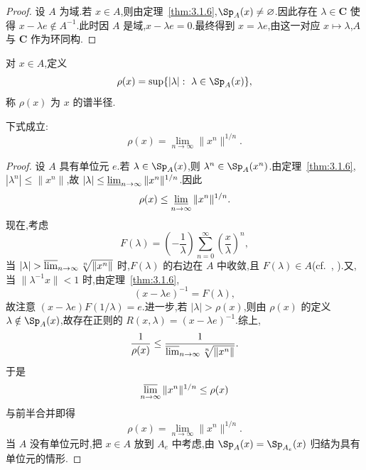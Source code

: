 \begin{proof}
设 $A$ 为域.若 $x \in A$,则由定理~\ref{thm:3.1.6},$\Sp_{A}(x) \neq \emptyset$.因此存在 $\lambda \in \mathbf{C}$ 使得 $x - \lambda e \notin A^{-1}$.此时因 $A$ 是域,$x - \lambda e = 0$.最终得到 $x = \lambda e$,由这一对应 $x \mapsto \lambda$,$A$ 与 $\mathbf{C}$ 作为环同构.
\end{proof}

\begin{definition}\label{def:3.1.8}
对 $x \in A$,定义
\begin{equation*}
\rho(x) = \sup\{|\lambda|:\ \lambda \in \Sp_{A}(x)\},
\end{equation*}
称 $\rho(x)$ 为 $x$ 的谱半径.
\end{definition}

\begin{theorem}\label{thm:3.1.9}
下式成立:
\begin{equation*}
\rho(x) = \lim_{n \to \infty}\|x^{n}\|^{1/n}.
\end{equation*}
\end{theorem}

\begin{proof}
设 $A$ 具有单位元 $e$.若 $\lambda \in \Sp_{A}(x)$,则 $\lambda^{n} \in \Sp_{A}(x^{n})$.由定理~\ref{thm:3.1.6},$|\lambda^{n}| \leq \|x^{n}\|$,故 $|\lambda| \leq \varliminf_{n \to \infty}\|x^{n}\|^{1/n}$.因此
\begin{equation*}
\rho(x) \leq \varliminf_{n \to \infty}\|x^{n}\|^{1/n}.
\end{equation*}
现在,考虑
\begin{equation*}
F(\lambda) = \left(-\frac{1}{\lambda}\right)\sum_{n=0}^{\infty}\left(\frac{x}{\lambda}\right)^{n},
\end{equation*}
当 $|\lambda| > \varlimsup_{n \to \infty}\sqrt[n]{\|x^{n}\|}$ 时,$F(\lambda)$ 的右边在 $A$ 中收敛,且 $F(\lambda) \in A$(cf.\ \cite{ch3:3}, \cite{ch3:8}).又,当 $\|\lambda^{-1}x\| < 1$ 时,由定理~\ref{thm:3.1.6},
\begin{equation*}
(x - \lambda e)^{-1} = F(\lambda),
\end{equation*}
故注意 $(x - \lambda e)F(1/\lambda) = e$.进一步,若 $|\lambda| > \rho(x)$,则由 $\rho(x)$ 的定义 $\lambda \notin \Sp_{A}(x)$,故存在正则的 $R(x, \lambda) = (x - \lambda e)^{-1}$.综上,
\begin{equation*}
\frac{1}{\rho(x)} \leq \frac{1}{\varlimsup_{n \to \infty}\sqrt[n]{\|x^{n}\|}}.
\end{equation*}
于是
\begin{equation*}
\varlimsup_{n \to \infty}\|x^{n}\|^{1/n} \leq \rho(x)
\end{equation*}
与前半合并即得
\begin{equation*}
\rho(x) = \lim_{n \to \infty}\|x^{n}\|^{1/n}.
\end{equation*}
当 $A$ 没有单位元时,把 $x \in A$ 放到 $A_{e}$ 中考虑,由 $\Sp_{A}(x) = \Sp_{A_{e}}(x)$ 归结为具有单位元的情形.
\end{proof}

